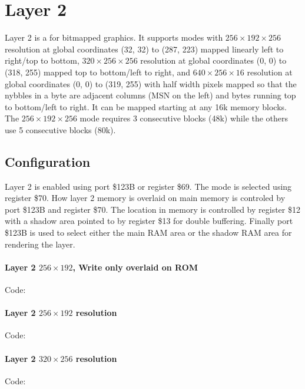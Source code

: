 \section{Layer 2}
Layer 2 is a for bitmapped graphics. It supports modes with
$256\times192\times256$ resolution at global coordinates (32, 32) to
(287, 223) mapped linearly left to right/top to bottom,
$320\times256\times256$ resolution at global coordinates (0, 0) to
(318, 255) mapped top to bottom/left to right, and
$640\times256\times16$ resolution at global coordinates (0, 0) to
(319, 255) with half width pixels mapped so that the nybbles in a byte
are adjacent columns (MSN on the left) and bytes running top to
bottom/left to right. It can be mapped starting at any 16k memory
blocks. The $256\times192\times256$ mode requires 3 consecutive blocks
(48k) while the others use 5 consecutive blocks (80k).

\subsection{Configuration}
Layer 2 is enabled using port \$123B or register \$69. The mode is
selected using register \$70. How layer 2 memory is overlaid on main
memory is controled by port \$123B and register \$70. The location in
memory is controlled by register \$12 with a shadow area pointed to by
register \$13 for double buffering. Finally port \$123B is used to
select either the main RAM area or the shadow RAM area for rendering
the layer.







\paragraph{Layer 2 $256\times192$, Write only overlaid on ROM}
Code:



\paragraph{Layer 2 $256\times192$ resolution}
Code:



\paragraph{Layer 2 $320\times256$ resolution}
Code:


